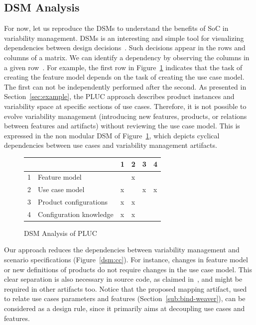 \documentclass{report}
\begin{document}
\begin{frontmatter}
{\subsection{DSM Analysis}
For now, let us reproduce the DSMs to understand the benefits of SoC in variability management. DSMs is an interesting and simple tool for visualizing dependencies between design decisions~\cite{clark-design-rules-book}. Such decisions appear in the rows and columns of a matrix. We can identify a dependency by observing the columns in a given row~\cite{clark-design-rules-book}. For example, the first row in Figure~\ref{dsm:pluc} indicates that the task of creating the feature model depends on the task of creating the use case model. The first can not be independently performed after the second. As presented in Section~\ref{sec:example}, the PLUC approach describes product instances and variability space at specific sections of use cases. Therefore, it is not possible to evolve variability management (introducing new features, products, or relations between features and artifacts) without reviewing the use case model.  This is expressed in the non modular DSM of Figure~\ref{dsm:pluc}, which depicts cyclical dependencies between use cases and variability management artifacts. 

\begin{figure}[htb]
\centering
\begin{small}
\begin{tabular}{llllll} \hline
&  & 1 & 2 & 3 & 4 \\ \hline
1 & Feature model 			& 	& x	& 	&   	\\ 
2 & Use case model 		& x 	&  	&  x	&  x  \\ 
3 & Product configurations	& x 	& x	& 	&    	\\
4 & Configuration knowledge 	& x 	& x 	& 	&    	\\ \hline
\end{tabular}
\end{small}
\nocaptionrule \caption{DSM Analysis of PLUC}
\label{dsm:pluc}
\end{figure}

Our approach reduces the dependencies between variability management and scenario specifications 
(Figure~\ref{dsm:cc}). For instance, changes in feature model or new definitions of products do not require changes in the use case model. This clear separation is also necessary in source code, as claimed in~\cite{alves-gpce-06, apel-icse2006}, and might be required in other artifacts too. Notice that the proposed mapping artifact, used to relate use cases parameters and features (Section~\ref{sub:bind-weaver}), can be considered as a design rule, since it primarily aims at decoupling use cases and features.  

}
\end{frontmatter}
\end{document}

